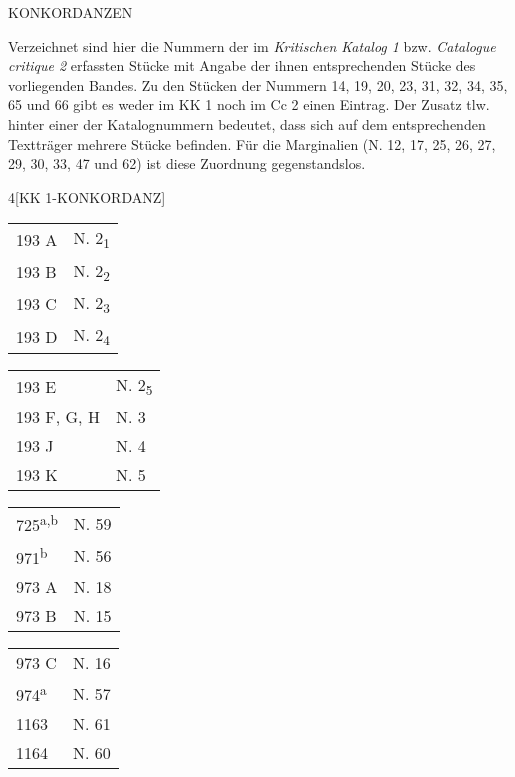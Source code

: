 \begin{center} \uppercase{Konkordanzen}\end{center}
Verzeichnet sind hier die Nummern der im \textit{Kritischen Katalog 1} bzw. \textit{Catalogue critique 2} erfassten St\"{u}cke mit Angabe der ihnen entsprechenden St\"{u}cke des vorliegenden Bandes. Zu den St\"{u}cken der Nummern 14, 19, 20, 23, 31, 32, 34, 35, 65 und 66 gibt es weder im KK 1 noch im Cc 2 einen Eintrag. Der Zusatz tlw. hinter einer der Katalognummern bedeutet, dass sich auf dem entsprechenden Texttr\"{a}ger mehrere St\"{u}cke befinden. F\"{u}r die Marginalien (N. 12, 17, 25, 26, 27, 29, 30, 33, 47 und 62) ist diese Zuordnung gegenstandslos.\\[1.0ex]
\begin{multicols}{4}[\centering\footnotesize{\uppercase{KK 1-Konkordanz}}]
\setlength{\columnseprule}{0.4pt}
\begin{tabular}{ll}
193 A & N. 2\textsubscript{1}\\
193 B & N. 2\textsubscript{2}\\
193 C & N. 2\textsubscript{3}\\
193 D & N. 2\textsubscript{4}
\end{tabular}
\columnbreak
\begin{tabular}{ll}
193 E & N. 2\textsubscript{5}\\
193 F, G, H & N. 3\\
193 J & N. 4\\
193 K & N. 5
\end{tabular}
\columnbreak
\begin{tabular}{ll}
725\textsuperscript{a,b} & N. 59\\
971\textsuperscript{b} & N. 56\\
973 A & N. 18\\
973 B & N. 15\\
\end{tabular}
\columnbreak
\begin{tabular}{ll}
973 C & N. 16\\
974\textsuperscript{a} & N. 57\\
1163 & N. 61\\
1164 & N. 60
\end{tabular}
\end{multicols}
\vspace{1.0ex}
